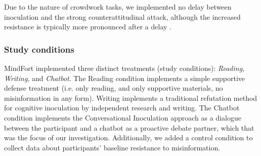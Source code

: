 \documentclass[sigconf]{acmart}
\begin{document}
Due to the nature of crowdwork tasks, we implemented no delay between inoculation and the strong counterattitudinal attack, although the increased resistance is typically more pronounced after a delay \cite{godbold2000}. 


\subsubsection{Study conditions}
\label{sec:conditions}
MindFort implemented three distinct treatments (study conditions): \textit{Reading}, \textit{Writing}, and \textit{Chatbot}.
The Reading condition implements a simple supportive defense treatment (i.e. only reading, and only supportive materials, no misinformation in any form). Writing implements a traditional refutation method for cognitive inoculation by independent research and writing. The Chatbot condition implements the Conversational Inoculation approach as a dialogue between the participant and a chatbot as a proactive debate partner, which that was the focus of our investigation.
Additionally, we added a control condition to collect data about participants' baseline resistance to misinformation. 

%
\end{document}
